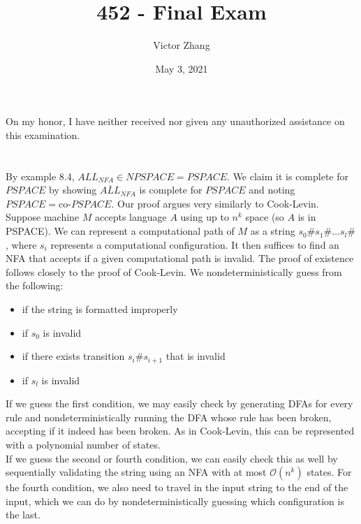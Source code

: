 \documentclass{article}
\title{452 - Final Exam}
\author{Victor Zhang}
\date{May 3, 2021}
\begin{document}
\maketitle

\section{}
On my honor, I have neither received nor given any unauthorized assistance on this examination.

\section{}
By example 8.4, $ALL_{NFA} \in NPSPACE = PSPACE$. We claim it is complete for $PSPACE$ by showing $\overline{ALL}_{NFA}$ is complete for $PSPACE$ and noting $PSPACE = \text{co-}PSPACE$. Our proof argues very similarly to Cook-Levin.\\
Suppose machine $M$ accepts language $A$ using up to $n^k$ space (so $A$ is in PSPACE). We can represent a computational path of $M$ as a string $s_0\#s_1\#\dots s_l\#$, where $s_i$ represents a computational configuration. It then suffices to find an NFA that accepts if a given computational path is invalid. The proof of existence follows closely to the proof of Cook-Levin. We nondeterministically guess from the following:
\begin{itemize}
\item if the string is formatted improperly
\item if $s_0$ is invalid
\item if there exists transition $s_i\#s_{i+1}$ that is invalid
\item if $s_l$ is invalid
\end{itemize}
If we guess the first condition, we may easily check by generating DFAs for every rule and nondeterministically running the DFA whose rule has been broken, accepting if it indeed has been broken. As in Cook-Levin, this can be represented with a polynomial number of states.\\
If we guess the second or fourth condition, we can easily check this as well by sequentially validating the string using an NFA with at most $\mathcal{O}(n^k)$ states. For the fourth condition, we also need to travel in the input string to the end of the input, which we can do by nondeterministically guessing which configuration is the last.\\
\end{document}
